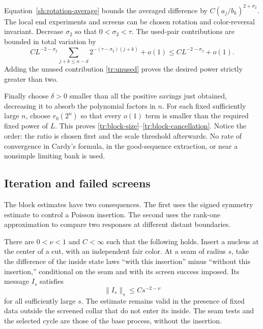 Equation~\eqref{sh:rotation-average} bounds the averaged difference
by $C(a_j/b_k)^{2+\sigma_2}$.  The local end experiments and screens
can be chosen rotation and color-reversal invariant.  Decrease
$\sigma_2$ so that $0<\sigma_2<\tau$.  The used-pair contributions
are bounded in total variation by
\begin{equation}
 C L^{-2-\sigma_2}
    \sum_{j+k\le n-d}2^{-(\tau-\sigma_2)(j+k)}+o(1)
                  \le C L^{-2-\sigma_2}+o(1).
\label{tr:signed-sum}
\end{equation}
Adding the unused contribution \eqref{tr:unused} proves the desired
power strictly greater than two.

Finally choose $\delta>0$ smaller than all the positive savings just
obtained, decreasing it to absorb the polynomial factors in $n$.
For each fixed sufficiently large $n$, choose $r_0(2^n)$ so that every
$o(1)$ term is smaller than the required fixed power of $L$.  This
proves \eqref{tr:block-size}--\eqref{tr:block-cancellation}.
Notice the order: the ratio is chosen first and the scale threshold
afterwards.  No rate of convergence in Cardy's formula, in the
good-sequence extraction, or near a nonsimple limiting bank is used.

\subsection{Iteration and failed screens}

The block estimates have two consequences.  The first uses the signed
symmetry estimate to control a Poisson insertion.  The second uses the
rank-one approximation to compare two responses at different distant
boundaries.

\begin{corollary}
\label{tr:insertion}
There are $0<\nu<1$ and $C<\infty$ such that the following holds.  Insert
a nucleus at the center of a cut, with an independent fair color.  At
a seam of radius $s$, take the difference of the inside state laws
``with this insertion'' minus ``without this insertion,'' conditional
on the seam and with its screen success imposed.  Its message
$I_s$ satisfies
\begin{equation}
                            \|I_s\|_s\le C s^{-2-\nu}
\label{tr:insertion-bound}
\end{equation}
for all sufficiently large $s$.  The estimate remains valid in the
presence of fixed data outside the screened collar that do not enter
its inside.  The seam tests and the selected cycle are those of the
base process, without the insertion.
\end{corollary}

